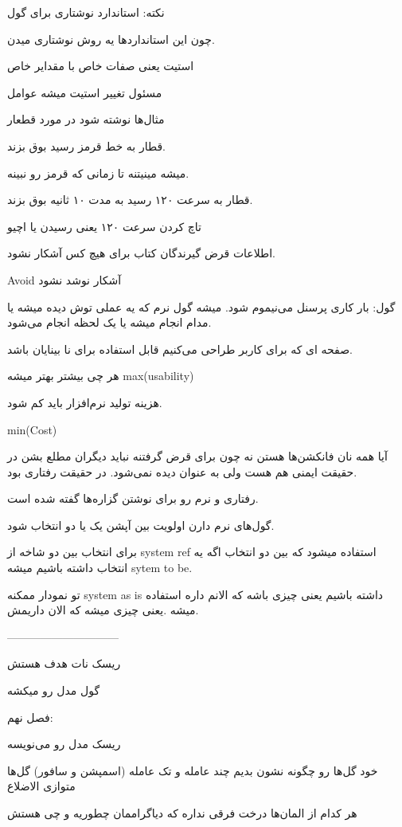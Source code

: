 نکته: استاندارد نوشتاری برای گول

چون این استاندارد‌ها یه روش نوشتاری میدن.

استیت یعنی صفات خاص با مقدایر خاص

مسئول تغییر استیت میشه عوامل

مثال‌ها نوشته شود در مورد قطعار

قطار به خط قرمز رسید بوق بزند.

میشه مینیتنه تا زمانی که قرمز رو نبینه.

قطار به سرعت ۱۲۰ رسید به مدت ۱۰ ثانیه بوق بزند.

تاچ کردن سرعت ۱۲۰ یعنی رسیدن یا اچیو

اطلاعات قرض گیرندگان کتاب برای هیچ کس آشکار نشود.

Avoid آشکار نوشد نشود

گول: بار کاری پرسنل می‌نیموم شود.
میشه گول نرم
که یه عملی توش دیده میشه
یا مدام انجام میشه
یا یک لحظه انجام می‌شود.

صفحه ای که برای کاربر طراحی می‌کنیم قابل استفاده برای نا بینایان باشد.

هر چی بیشتر بهتر میشه max(usability)

هزینه تولید نرم‌افزار باید کم شود.

min(Cost)

آیا همه نان فانکشن‌ها هستن نه
چون برای قرض گرفتنه نباید دیگران مطلع بشن در حقیقت ایمنی هم هست ولی به عنوان
 دیده نمی‌شود. در حقیقت رفتاری بود.

رفتاری و نرم رو برای نوشتن گزاره‌ها گفته شده است.

گول‌های نرم دارن اولویت بین آپشن یک یا دو انتخاب شود.

برای انتخاب بین دو شاخه از system ref استفاده میشود که بین دو انتخاب اگه یه
انتخاب داشته باشیم میشه sytem to be.

تو نمودار ممکنه system as is داشته باشیم یعنی چیزی باشه که الانم داره استفاده
میشه .یعنی چیزی میشه که الان داریمش.


------------------------------

ریسک نات هدف هستش

گول مدل رو میکشه

فصل نهم:

ریسک مدل رو می‌نویسه

خود گل‌ها رو چگونه نشون بدیم
چند عامله و تک عامله (اسمپشن و سافور) گل‌ها متوازی الاضلاع

هر کدام از المان‌ها درخت فرقی نداره که دیاگراممان چطوریه و چی هستش


